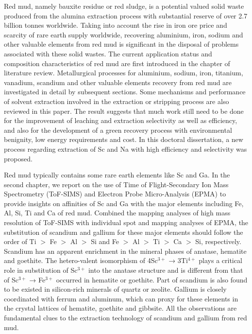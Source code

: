 \begin{eabstract}
Red mud, namely bauxite residue or red sludge, is a potential valued solid waste produced from the alumina extraction process with substantial reserve of over 2.7 billion tonnes worldwide. Taking into account the rise in iron ore price and scarcity of rare earth supply worldwide, recovering aluminium, iron, sodium and other valuable elements from red mud is significant in the disposal of problems associated with these solid wastes. The current application status and composition characteristics of red mud are first introduced in the chapter of literature review. Metallurgical processes for aluminium, sodium, iron, titanium, vanadium, scandium and other valuable elements recovery from red mud are investigated in detail by subsequent sections. Some mechanisms and performance of solvent extraction involved in the extraction or stripping process are also reviewed in this paper. The result suggests that much work still need to be done for the improvement of leaching and extraction selectivity as well as efficiency, and also for the development of a green recovery process with environmental benignity, low energy requirements and cost. In this doctoral dissertation, a new process regarding extraction of Sc and Na with high efficiency and selectivity was proposed.

Red mud typically contains some rare earth elements like Sc and Ga. In the second chapter, we report on the use of Time of Flight-Secondary Ion Mass Spectrometry (ToF-SIMS) and Electron Probe Micro-Analysis (EPMA) to provide insights on affinities of Sc and Ga with the major elements including Fe, Al, Si, Ti and Ca of red mud. Combined the mapping analyses of high mass resolution of ToF-SIMS with individual spot and mapping analyses of EPMA, the substitution of scandium and gallium for these major elements should follow the order of Ti $ > $ Fe $ > $ Al $ > $ Si and Fe $ > $ Al $ > $ Ti $ > $ Ca $ > $ Si, respectively. Scandium has an apparent enrichment in the mineral phases of anatase, hematite and goethite. The hetero-valent isomorphism of 4Sc$ ^{\mathrm{3+}} $ → 3Ti$ ^{\mathrm{4+}} $ plays a critical role in substitution of Sc$ ^{\mathrm{3+}} $ into the anatase structure and is different from that of Sc$ ^{\mathrm{3+}} $ → Fe$ ^{\mathrm{3+}} $ occurred in hematite or goethite. Part of scandium is also found to be existed in silicon-rich minerals of quartz or zeolite. Gallium is closely coordinated with ferrum and aluminum, which can proxy for these elements in the crystal lattices of hematite, goethite and gibbsite. All the observations are fundamental clues to the extraction technology of scandium and gallium from red mud.


\end{eabstract}
